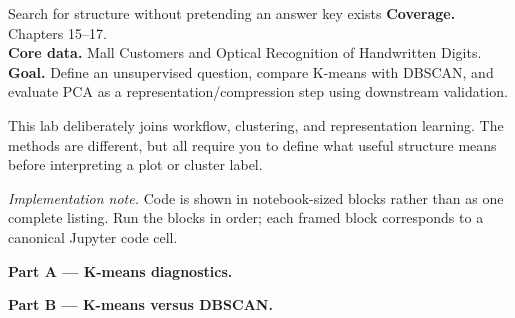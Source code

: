 
\begin{labproject}{Search for structure without pretending an answer key exists}
\textbf{Coverage.} Chapters 15--17.\\
\textbf{Core data.} Mall Customers and Optical Recognition of Handwritten Digits.\\
\textbf{Goal.} Define an unsupervised question, compare K-means with DBSCAN, and evaluate PCA as a representation/compression step using downstream validation.

\begin{labmode}
This lab deliberately joins workflow, clustering, and representation learning. The methods are different, but all require you to define what useful structure means before interpreting a plot or cluster label.
\end{labmode}

\smallskip\noindent\textit{Implementation note.} Code is shown in notebook-sized blocks rather than as one complete listing. Run the blocks in order; each framed block corresponds to a canonical Jupyter code cell.\par

\medskip\noindent\textbf{Part A --- K-means diagnostics.}\par






\medskip\noindent\textbf{Part B --- K-means versus DBSCAN.}\par









\end{labproject}

